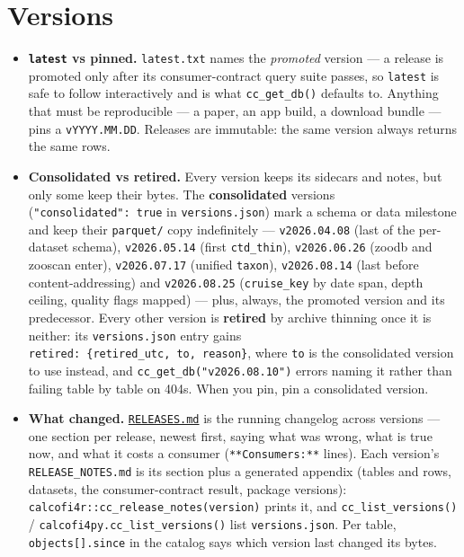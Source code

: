 \documentclass[
  letterpaper,
  DIV=11,
  numbers=noendperiod]{scrreprt}
\providecommand{\tightlist}{%
  \setlength{\itemsep}{0pt}\setlength{\parskip}{0pt}}
\begin{document}
\section{Versions}\label{sec-versions}

\begin{itemize}
\tightlist
\item
  \textbf{\texttt{latest} vs pinned.} \texttt{latest.txt} names the
  \emph{promoted} version --- a release is promoted only after its
  consumer-contract query suite passes, so \texttt{latest} is safe to
  follow interactively and is what \texttt{cc\_get\_db()} defaults to.
  Anything that must be reproducible --- a paper, an app build, a
  download bundle --- pins a \texttt{vYYYY.MM.DD}. Releases are
  immutable: the same version always returns the same rows.
\item
  \textbf{Consolidated vs retired.} Every version keeps its sidecars and
  notes, but only some keep their bytes. The \textbf{consolidated}
  versions (\texttt{"consolidated":\ true} in \texttt{versions.json})
  mark a schema or data milestone and keep their \texttt{parquet/} copy
  indefinitely --- \texttt{v2026.04.08} (last of the per-dataset
  schema), \texttt{v2026.05.14} (first \texttt{ctd\_thin}),
  \texttt{v2026.06.26} (zoodb and zooscan enter), \texttt{v2026.07.17}
  (unified \texttt{taxon}), \texttt{v2026.08.14} (last before
  content-addressing) and \texttt{v2026.08.25} (\texttt{cruise\_key} by
  date span, depth ceiling, quality flags mapped) --- plus, always, the
  promoted version and its predecessor. Every other version is
  \textbf{retired} by archive thinning once it is neither: its
  \texttt{versions.json} entry gains
  \texttt{retired:\ \{retired\_utc,\ to,\ reason\}}, where \texttt{to}
  is the consolidated version to use instead, and
  \texttt{cc\_get\_db("v2026.08.10")} errors naming it rather than
  failing table by table on 404s. When you pin, pin a consolidated
  version.
\item
  \textbf{What changed.}
  \href{https://storage.googleapis.com/calcofi-db/ducklake/releases/RELEASES.md}{\texttt{RELEASES.md}}
  is the running changelog across versions --- one section per release,
  newest first, saying what was wrong, what is true now, and what it
  costs a consumer (\texttt{**Consumers:**} lines). Each version's
  \texttt{RELEASE\_NOTES.md} is its section plus a generated appendix
  (tables and rows, datasets, the consumer-contract result, package
  versions): \texttt{calcofi4r::cc\_release\_notes(version)} prints it,
  and \texttt{cc\_list\_versions()} /
  \texttt{calcofi4py.cc\_list\_versions()} list \texttt{versions.json}.
  Per table, \texttt{objects{[}{]}.since} in the catalog says which
  version last changed its bytes.
\end{itemize}
\end{document}
